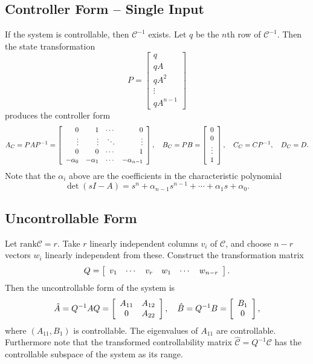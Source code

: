 \documentclass{article}
\begin{document}
\subsection{Controller Form -- Single Input}
If the system is controllable, then $\mathcal{C}^{-1}$ exists. Let $q$
be the $n$th row of $\mathcal{C}^{-1}$. Then the state transformation
$$
P =
\left[\begin{array}{c}
  q        \\
  q A      \\
  q A^2    \\
  \vdots   \\
  q A^{n-1}
\end{array}\right]
$$
produces the controller form
$$
A_C = P A P^{-1} =
\left[\begin{array}{r r r r}
  0         & 1         & \cdots & 0      \\
  \vdots    & \vdots    & \ddots & \vdots \\
  0         & 0         & \cdots & 1      \\
  -\alpha_0 & -\alpha_1 & \cdots & -\alpha_{n-1}
\end{array}\right], \quad
B_C = PB =
\left[\begin{array}{c}
  0      \\
  0      \\
  \vdots \\
  1
\end{array}\right], \quad
C_C = CP^{-1}, \quad
D_C = D.
$$
Note that the $\alpha_i$ above are the coefficients in the
characteristic polynomial
$$
\det (sI - A) =
s^n + \alpha_{n-1} s^{n-1} + \cdots + \alpha_1 s + \alpha_0.
$$

\subsection{Uncontrollable Form }
Let $\mathrm{rank} \mathcal{C} = r$. Take $r$ linearly independent
columns $v_i$ of $\mathcal{C}$, and choose $n - r$ vectors $w_i$ linearly
independent from these. Construct the transformation matrix
$$
Q =
\left[\begin{array}{c c c c c c}
  v_1 & \cdots & v_r & w_1 & \cdots & w_{n-r} \\
\end{array}\right].
$$
Then the uncontrollable form of the system is
$$
\hat{A} = Q^{-1} A Q =
\left[\begin{array}{c c}
  A_{11} & A_{12} \\
  0     & A_{22}
\end{array}\right], \quad
\hat{B} = Q^{-1} B =
\left[\begin{array}{c}
  B_1 \\
  0
\end{array}\right],
$$
where $(A_{11}, B_1)$ is controllable. The eigenvalues of $A_{11}$ are
controllable. Furthermore note that the transformed controllability
matrix $\hat{\mathcal{C}} = Q^{-1} \mathcal{C}$ has the controllable
subspace of the system as its range.
\end{document}
